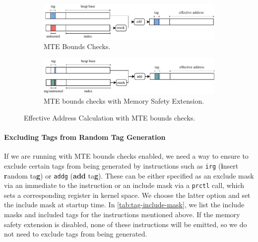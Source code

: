 \begin{figure}[t]
  \centering
  \begin{subfigure}[T]{\textwidth}
    \centering
    \includegraphics{figures/build/bounds}
    \caption{\ac{MTE} Bounds Checks.}
    \label{fig:mte-bounds-checks}
  \end{subfigure}
  \hfill
  \begin{subfigure}[T]{\textwidth}
    \centering
    \includegraphics{figures/build/bounds-mem-safety}
    \caption{\ac{MTE} bounds checks with Memory Safety Extension.}
    \label{fig:mte-bounds-checks-mem-safety}
  \end{subfigure}
  \caption{Effective Address Calculation with \ac{MTE} bounds checks.}
  \label{fig:system-design-mem-safety-bounds}
\end{figure}

\paragraph{Excluding Tags from Random Tag Generation}
If we are running with \ac{MTE} bounds checks enabled, we need a way to ensure to exclude certain tags from being generated by instructions such as \texttt{irg} (\textbf{i}nsert \textbf{r}andom ta\textbf{g}) or \texttt{addg} (\textbf{add} ta\textbf{g}).
These can be either specified as an exclude mask via an immediate to the instruction or an include mask via a \texttt{prctl} call, which sets a corresponding register in kernel space.
We choose the latter option and set the include mask at startup time.
In \cref{tab:tag-include-mask}, we list the include masks and included tags for the instructions mentioned above.
If the memory safety extension is disabled, none of these instructions will be emitted, so we do not need to exclude tags from being generated.

